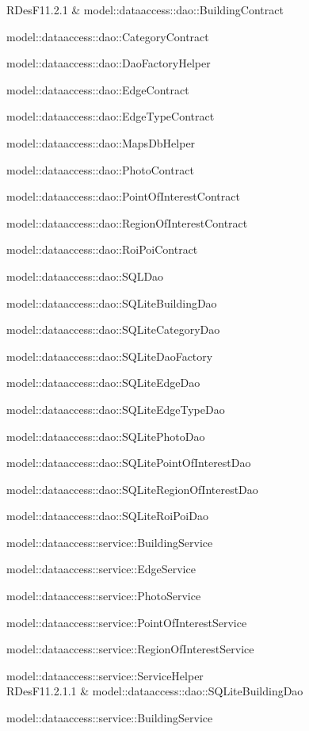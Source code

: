 \documentclass[../DefinizioneDiProdotto.tex]{subfiles}
\begin{document}
\begin{longtabu}
RDesF11.2.1 & model::dataaccess::dao::BuildingContract \par model::dataaccess::dao::CategoryContract \par model::dataaccess::dao::DaoFactoryHelper \par model::dataaccess::dao::EdgeContract \par model::dataaccess::dao::EdgeTypeContract \par model::dataaccess::dao::MapsDbHelper \par model::dataaccess::dao::PhotoContract \par model::dataaccess::dao::PointOfInterestContract \par model::dataaccess::dao::RegionOfInterestContract \par model::dataaccess::dao::RoiPoiContract \par model::dataaccess::dao::SQLDao \par model::dataaccess::dao::SQLiteBuildingDao \par model::dataaccess::dao::SQLiteCategoryDao \par model::dataaccess::dao::SQLiteDaoFactory \par model::dataaccess::dao::SQLiteEdgeDao \par model::dataaccess::dao::SQLiteEdgeTypeDao \par model::dataaccess::dao::SQLitePhotoDao \par model::dataaccess::dao::SQLitePointOfInterestDao \par model::dataaccess::dao::SQLiteRegionOfInterestDao \par model::dataaccess::dao::SQLiteRoiPoiDao \par model::dataaccess::service::BuildingService \par model::dataaccess::service::EdgeService \par model::dataaccess::service::PhotoService \par model::dataaccess::service::PointOfInterestService \par model::dataaccess::service::RegionOfInterestService \par model::dataaccess::service::ServiceHelper \\ 
\midrule 
RDesF11.2.1.1 & model::dataaccess::dao::SQLiteBuildingDao \par model::dataaccess::service::BuildingService \\ 
\midrule 

\end{longtabu}
\end{document}

